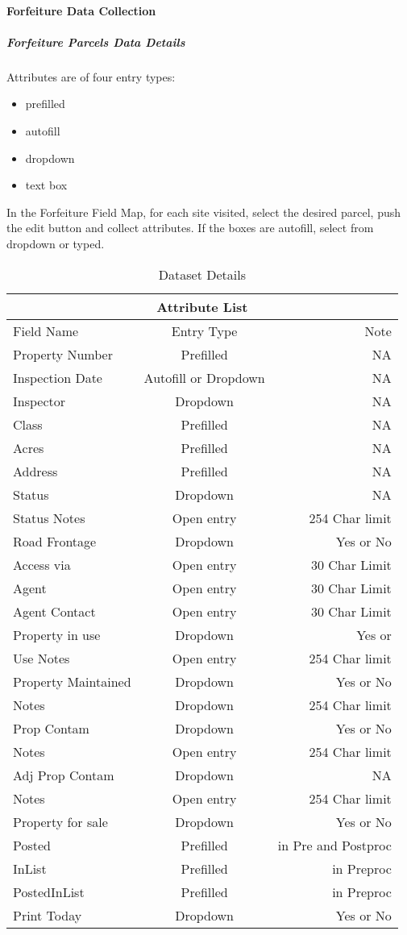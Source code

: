 \documentclass[class=article , crop=false, titlepage, twoside, multi={itemize, figure, verbatim}, float=false]{standalone}
\begin{document}
\paragraph{Forfeiture Data Collection}
\subparagraph{Forfeiture Parcels Data Details}
Attributes are of four entry types:\begin{itemize}
\item prefilled
\item autofill
\item dropdown
\item text box \end{itemize}
In the Forfeiture Field Map, for each site visited, select the desired parcel, push the edit button and collect attributes.  If the boxes are autofill, select from dropdown or typed.\bigskip 
\begin{table}
\centering
\begin{tabular}{|l|c|r|}
\hline
\multicolumn{3}{|c|}{Attribute List} \\
\hline
Field Name&Entry Type&Note\\ \hline
Property Number&Prefilled&NA\\
Inspection Date&{\scriptsize Autofill or Dropdown}&NA\\
Inspector&Dropdown&NA\\
Class&Prefilled&NA\\
Acres&Prefilled&NA\\
Address&Prefilled&NA\\
Status&Dropdown&NA\\
Status Notes&Open entry&254 Char limit\\
Road Frontage&Dropdown&Yes or No\\
Access via&Open entry&30 Char Limit\\
Agent&Open entry&30 Char Limit\\
Agent Contact&Open entry&30 Char Limit\\
Property in use&Dropdown&Yes or\\
Use Notes&Open entry&254 Char limit\\
Property Maintained&Dropdown&Yes or No\\
Notes&Dropdown&254 Char limit\\
Prop Contam&Dropdown&Yes or No\\
Notes&Open entry&254 Char limit\\
Adj Prop Contam&Dropdown&NA\\
Notes&Open entry&254 Char limit\\
Property for sale&Dropdown&Yes or No\\
Posted&Prefilled&in Pre and Postproc\\
InList&Prefilled&in Preproc\\
PostedInList&Prefilled&in Preproc\\
Print Today&Dropdown&Yes or No\\ \hline
\end{tabular}
\caption{Dataset Details}
\end{table}
\end{document}
